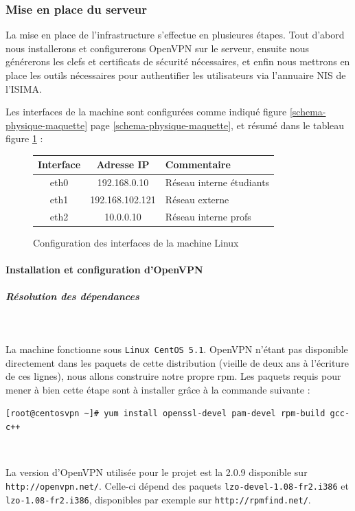 \subsubsection{Mise en place du serveur}

La mise en place de l'infrastructure s'effectue en plusieures étapes. Tout d'abord nous installerons et configurerons OpenVPN sur le serveur, ensuite nous générerons les clefs et certificats de sécurité nécessaires, et enfin nous mettrons en place les outils nécessaires pour authentifier les utilisateurs via l'annuaire NIS de l'ISIMA.

Les interfaces de la machine sont configurées comme indiqué figure \ref{schema-physique-maquette} page \ref{schema-physique-maquette}, et résumé dans le tableau figure \ref{linux_interfaces} :

\begin{figure}[H]
	\begin{center}
		\begin{tabular}{c|c|l}
			Interface & Adresse IP & Commentaire \\
			\hline
			eth0 & 192.168.0.10 & Réseau interne étudiants \\
			eth1 & 192.168.102.121 & Réseau externe \\
			eth2 & 10.0.0.10 & Réseau interne profs \\
		\end{tabular}
	\end{center}
	\caption{Configuration des interfaces de la machine Linux}
	\label{linux_interfaces}
\end{figure}


\paragraph{Installation et configuration d'OpenVPN}

\subparagraph{Résolution des dépendances}
~

La machine fonctionne sous \texttt{Linux CentOS 5.1}. OpenVPN n'étant pas disponible directement dans les paquets de cette distribution (vieille de deux ans à l'écriture de ces lignes), nous allons construire notre propre rpm. Les paquets requis pour mener à bien cette étape sont à installer grâce à la commande suivante :

\verb|[root@centosvpn ~]# yum install openssl-devel pam-devel rpm-build gcc-c++|

~

La version d'OpenVPN utilisée pour le projet est la 2.0.9 disponible sur \verb|http://openvpn.net/|. Celle-ci dépend des paquets \verb|lzo-devel-1.08-fr2.i386| et \verb|lzo-1.08-fr2.i386|, disponibles par exemple sur \verb|http://rpmfind.net/|.

